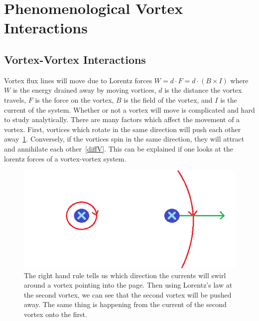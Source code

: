 \section{Phenomenological Vortex Interactions}

\subsection{Vortex-Vortex Interactions}
	 Vortex flux lines will move due to Lorentz forces $W = d \cdot F = d \cdot (B \times I)$ where $W$ is the energy drained away by moving vortices, $d$ is the distance the vortex travels, $F$ is the force on the vortex, $B$ is the field of the vortex, and $I$ is the current of the system. Whether or not a vortex will move is complicated and hard to study analytically. There are many factors which affect the movement of a vortex. First, vortices which rotate in the same direction will push each other away~\ref{sameV}. Conversely, if the vortices spin in the same direction, they will attract and annihilate each other~\ref{diffV}. This can be explained if one looks at the lorentz forces of a vortex-vortex system.

\begin{figure}[htbp]
\begin{center}
\includegraphics[scale=.50]{sameVortex.png}
\caption{The right hand rule tells us which direction the currents will swirl around a vortex pointing into the page. Then using Lorentz's law  at the second vortex, we can see that the second vortex will be pushed away. The same thing is happening from the current of the second vortex onto the first.}
\label{sameV}
\end{center}
\end{figure}

